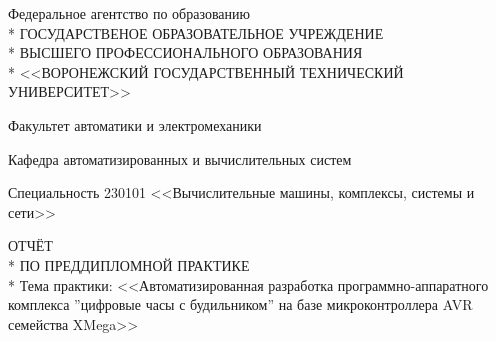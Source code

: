 \begin{center}
Федеральное агентство по образованию \\*
ГОСУДАРСТВЕНОЕ ОБРАЗОВАТЕЛЬНОЕ УЧРЕЖДЕНИЕ \\*
ВЫСШЕГО ПРОФЕССИОНАЛЬНОГО ОБРАЗОВАНИЯ \\*
<<ВОРОНЕЖСКИЙ ГОСУДАРСТВЕННЫЙ ТЕХНИЧЕСКИЙ УНИВЕРСИТЕТ>> \\
\end{center}
\begin{center}
Факультет  автоматики и электромеханики \\
\end{center}
\begin{center}
Кафедра автоматизированных и вычислительных систем \\
\end{center}

\begin{center}
Специальность 230101 <<Вычислительные машины, комплексы, системы и сети>>
\end{center}

\vspace{1em}

\begin{center}
ОТЧЁТ \\*
ПО ПРЕДДИПЛОМНОЙ ПРАКТИКЕ \\*
Тема практики: <<Автоматизированная разработка программно-аппаратного комплекса
''цифровые часы с будильником'' на базе микроконтроллера AVR семейства XMega>>
\end{center}

\vspace{1em}

